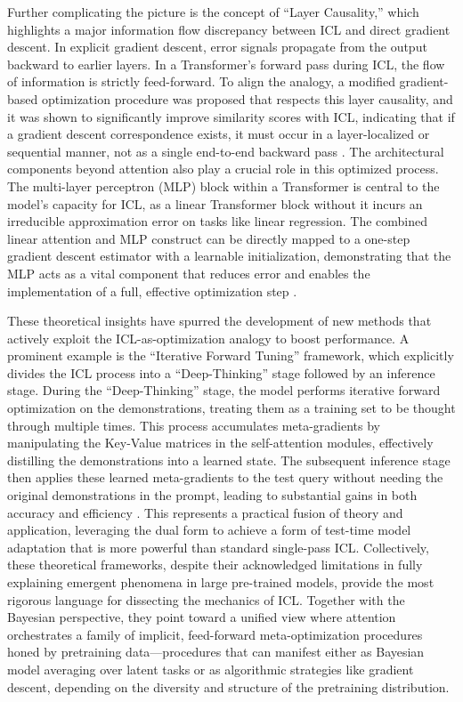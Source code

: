 \documentclass[11pt]{article}
\begin{document}
Further complicating the picture is the concept of ``Layer Causality,'' which highlights a major information flow discrepancy between ICL and direct gradient descent. In explicit gradient descent, error signals propagate from the output backward to earlier layers. In a Transformer's forward pass during ICL, the flow of information is strictly feed-forward. To align the analogy, a modified gradient-based optimization procedure was proposed that respects this layer causality, and it was shown to significantly improve similarity scores with ICL, indicating that if a gradient descent correspondence exists, it must occur in a layer-localized or sequential manner, not as a single end-to-end backward pass \cite{ref10}. The architectural components beyond attention also play a crucial role in this optimized process. The multi-layer perceptron (MLP) block within a Transformer is central to the model's capacity for ICL, as a linear Transformer block without it incurs an irreducible approximation error on tasks like linear regression. The combined linear attention and MLP construct can be directly mapped to a one-step gradient descent estimator with a learnable initialization, demonstrating that the MLP acts as a vital component that reduces error and enables the implementation of a full, effective optimization step \cite{ref44}.

These theoretical insights have spurred the development of new methods that actively exploit the ICL-as-optimization analogy to boost performance. A prominent example is the ``Iterative Forward Tuning'' framework, which explicitly divides the ICL process into a ``Deep-Thinking'' stage followed by an inference stage. During the ``Deep-Thinking'' stage, the model performs iterative forward optimization on the demonstrations, treating them as a training set to be thought through multiple times. This process accumulates meta-gradients by manipulating the Key-Value matrices in the self-attention modules, effectively distilling the demonstrations into a learned state. The subsequent inference stage then applies these learned meta-gradients to the test query without needing the original demonstrations in the prompt, leading to substantial gains in both accuracy and efficiency \cite{ref45}. This represents a practical fusion of theory and application, leveraging the dual form to achieve a form of test-time model adaptation that is more powerful than standard single-pass ICL. Collectively, these theoretical frameworks, despite their acknowledged limitations in fully explaining emergent phenomena in large pre-trained models, provide the most rigorous language for dissecting the mechanics of ICL. Together with the Bayesian perspective, they point toward a unified view where attention orchestrates a family of implicit, feed-forward meta-optimization procedures honed by pretraining data---procedures that can manifest either as Bayesian model averaging over latent tasks or as algorithmic strategies like gradient descent, depending on the diversity and structure of the pretraining distribution.
\end{document}

